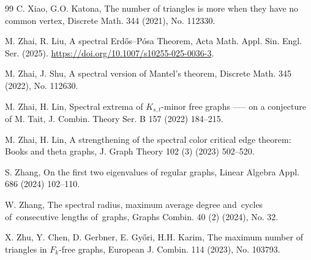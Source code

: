 \documentclass[11pt]{article}
\begin{document}
\begin{thebibliography}{99}
C. Xiao, G.O. Katona, 
 The number of triangles is more when they have no
common vertex, Discrete Math. 344 (2021), No. 112330. 


M. Zhai, R. Liu, A spectral Erd\H{o}s--P\'{o}sa Theorem, 
Acta Math. Appl. Sin. Engl. Ser. (2025). \url{https://doi.org/10.1007/s10255-025-0036-3}. 



M. Zhai, J. Shu, 
A spectral version of Mantel's theorem, 
Discrete Math. 345 (2022), No. 112630. 

M. Zhai, H. Lin,  
Spectral extrema of $K_{s,t}$-minor free 
graphs ----- on a conjecture of M. Tait, 
J. Combin. Theory Ser. B 157 (2022) 184--215.  



M. Zhai, H. Lin,
A strengthening of the spectral color critical edge
theorem: Books and theta graphs,
J. Graph Theory 102 (3) (2023) 502--520. 


S. Zhang, 
On the first two eigenvalues of regular graphs, 
Linear Algebra Appl. 686 (2024) 102--110. 

W. Zhang, 
The spectral radius, maximum average degree and cycles 
of consecutive lengths of graphs, 
Graphs Combin. 40 (2) (2024), No. 32.

X. Zhu, Y. Chen, D. Gerbner, E. Gy\H{o}ri, H.H. Karim, 
The maximum number of triangles in $F_k$-free graphs, 
European J. Combin. 114 (2023), No. 103793. 
\end{thebibliography}
\end{document}
